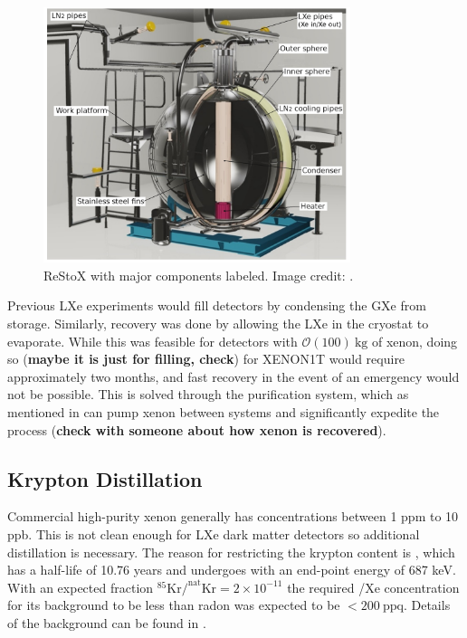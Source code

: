 \begin{figure}
\centering
\includegraphics[width=0.8\textwidth]{ReStoX}
\caption{ReStoX with major components labeled.  Image credit: .}
\label{fig:xenon1t_restox_pic}
\end{figure}

Previous LXe experiments would fill detectors by condensing the GXe from storage.  Similarly, recovery was done by allowing the LXe
in the cryostat to evaporate.  While this was feasible for detectors with $\mathcal{O}(100)\ \mathrm{kg}$ of xenon, doing so
(\textbf{maybe it is just for filling, check}) for XENON1T would require approximately two months, and fast recovery in the event of an
emergency would not be possible.  This is solved through the purification system, which as mentioned in  can
pump xenon between systems and significantly expedite the process (\textbf{check with someone about how xenon is recovered}).



\subsection{Krypton Distillation}
\label{subsec:xenon1t_kr_dist}
Commercial high-purity xenon generally has  concentrations between 1 ppm to 10 ppb.  This is not clean enough for LXe dark matter
detectors so additional distillation is necessary.  The reason for restricting the
krypton content is , which has a half-life of 10.76 years and undergoes \betadecay with an end-point energy of 687 keV.  With
an expected fraction $\mathrm{^{85}Kr / ^{nat}Kr = 2 \times 10^{-11}}$ the required /Xe concentration for its background to be
less than radon was expected to be $< 200\ \mathrm{ppq}$.  Details of the  background can be found in
.


